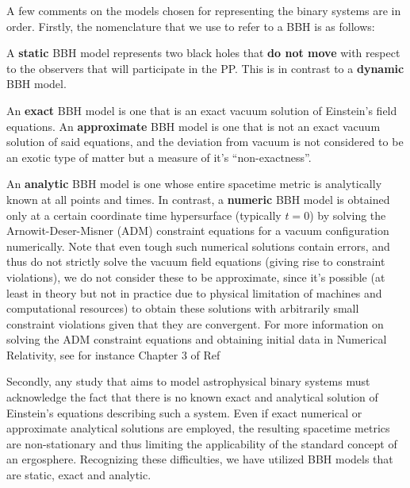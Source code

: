 A few comments on the models chosen for representing the binary systems are in order. Firstly, the nomenclature that we use to refer to a BBH is as follows:

\begin{definition}
    A \textbf{static} BBH model represents two black holes that \textbf{do not move} with respect to the observers that will participate in the PP. This is in contrast to a \textbf{dynamic} BBH model.
\end{definition}

\begin{definition}
    An \textbf{exact} BBH model is one that is an exact vacuum solution of Einstein's field equations. An \textbf{approximate} BBH model is one that is not an exact vacuum solution of said equations, and the deviation from vacuum is not considered to be an exotic type of matter but a measure of it's ``non-exactness''.
\end{definition}

\begin{definition}
    An \textbf{analytic} BBH model is one whose entire spacetime metric is analytically known at all points and times. In contrast, a \textbf{numeric} BBH model is obtained only at a certain coordinate time hypersurface (typically $t=0$) by solving the Arnowit-Deser-Misner (ADM) constraint equations for a vacuum configuration numerically. Note that even tough such numerical solutions contain errors, and thus do not strictly solve the vacuum field equations (giving rise to constraint violations), we do not consider these to be approximate, since it's possible (at least in theory but not in practice due to physical limitation of machines and computational resources) to obtain these solutions with arbitrarily small constraint violations given that they are convergent. For more information on solving the ADM constraint equations and obtaining initial data in Numerical Relativity, see for instance Chapter 3 of Ref~\cite{Alcubierre2012-xp}
\end{definition}

Secondly, any study that aims to model astrophysical binary systems must acknowledge the fact that there is no known exact and analytical solution of Einstein's equations describing such a system. Even if exact numerical or approximate analytical solutions are employed, the resulting spacetime metrics are non-stationary and thus limiting the applicability of the standard concept of an ergosphere. Recognizing these difficulties, we have utilized BBH models that are static, exact and analytic.

